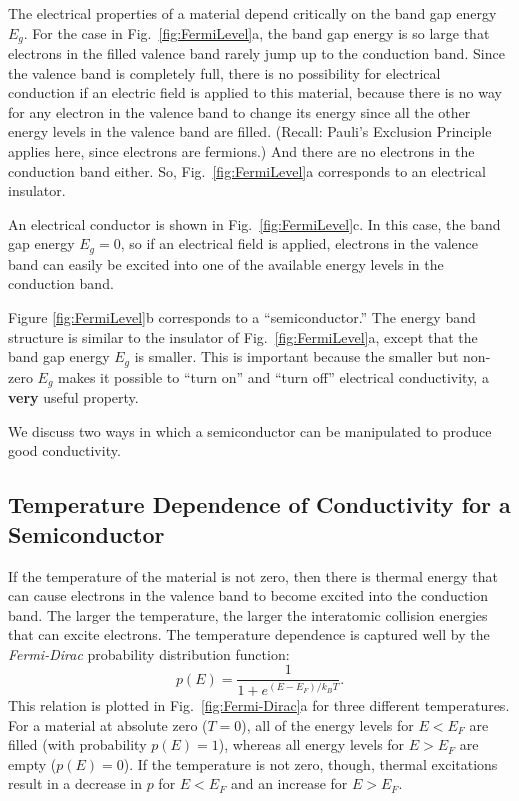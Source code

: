 The electrical properties of a material depend critically on the band gap
energy $E_g$. For the case in Fig.~\ref{fig:FermiLevel}a, the band gap
energy is so large that electrons in the filled valence band rarely jump
up to the conduction band. Since the valence band is completely full,
there is no possibility for electrical conduction if an electric field
is applied to this material, because there is no way for any electron in
the valence band to change its energy since all the other energy levels
in the valence band are filled. (Recall: Pauli's Exclusion Principle
applies here, since electrons are fermions.) And there are no electrons
in the conduction band either. So, Fig.~\ref{fig:FermiLevel}a corresponds
to an electrical insulator.

An electrical conductor is shown in Fig.~\ref{fig:FermiLevel}c. In this
case, the band gap energy $E_g = 0$, so if an electrical field is applied, electrons
in the valence band can easily be excited into one of the available energy
levels in the conduction band.

Figure \ref{fig:FermiLevel}b corresponds to a ``semiconductor.'' The
energy band structure is similar to the insulator of Fig.~\ref{fig:FermiLevel}a,
except that the band gap energy $E_g$ is smaller. This is important because
the smaller but non-zero $E_g$ makes it possible to ``turn on'' and ``turn off''
electrical conductivity, a {\bf very} useful property.

We discuss two ways in which a semiconductor can be manipulated to
produce good conductivity.

\subsection{Temperature Dependence of Conductivity for a Semiconductor}

If the temperature of the material is not zero, then there is
thermal energy that can cause electrons in the valence band to 
become excited into the conduction band. The larger the temperature,
the larger the interatomic collision energies that can excite electrons.
The temperature dependence is captured well by the {\it Fermi-Dirac}
probability distribution function:
\begin{equation}
p(E) = \frac{1}{1+e^{(E-E_F)/k_BT}} .
\label{eq:Fermi-Dirac}
\end{equation}
This relation is plotted in Fig.~\ref{fig:Fermi-Dirac}a for three
different temperatures.  For a material at absolute zero ($T = 0$), all
of the energy levels for $E < E_F$ are filled (with probability $p(E) = 1$),
whereas all energy levels for $E > E_F$ are empty ($p(E) = 0$).
If the temperature is not zero, though, thermal excitations result in
a decrease in $p$ for $E < E_F$ and an increase for $E > E_F$.

